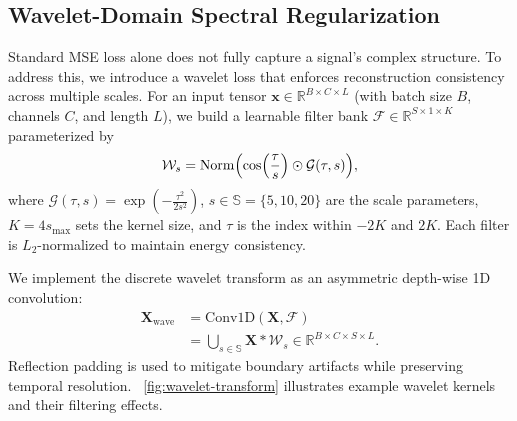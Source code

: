 \documentclass[conference]{IEEEtran}
\begin{document}
\subsection{Wavelet-Domain Spectral Regularization} \label{subsec:wavelet}
Standard MSE loss alone does not fully capture a signal's complex structure. To address this, we introduce a wavelet loss that enforces reconstruction consistency across multiple scales. For an input tensor $\mathbf{x}\in\mathbb{R}^{B\times C\times L}$ (with batch size $B$, channels $C$, and length $L$), we build a learnable filter bank $\mathcal{F}\in\mathbb{R}^{S\times 1\times K}$ parameterized by
\begin{equation}
    \label{eq:wavelet}
    \mathcal{W}_s = \operatorname{Norm}\Bigl(\cos\Bigl(\frac{\tau}{s}\Bigr) \odot \mathcal{G}(\tau,s)\Bigr),
\end{equation}
where $\mathcal{G}(\tau,s)=\exp\left(-\frac{\tau^2}{2s^2}\right)$, $s\in\mathbb{S} = \{5, 10, 20\}$ are the scale parameters, $K=4s_{\text{max}}$ sets the kernel size, and $\tau$ is the index within $-2K$ and $2K$. Each filter is $L_2$-normalized to maintain energy consistency.

We implement the discrete wavelet transform as an asymmetric depth-wise 1D convolution:
\begin{equation}
    \begin{aligned}
        \mathbf{X}_{\text{wave}} & = \text{Conv1D}(\mathbf{X}, \mathcal{F})                                                            \\
                                 & = \bigcup_{s\in\mathbb{S}} \mathbf{X}\ast \mathcal{W}_s \in \mathbb{R}^{B\times C\times S\times L}.
    \end{aligned}
\end{equation}
Reflection padding is used to mitigate boundary artifacts while preserving temporal resolution. \figurename~\ref{fig:wavelet-transform} illustrates example wavelet kernels and their filtering effects.
\end{document}
